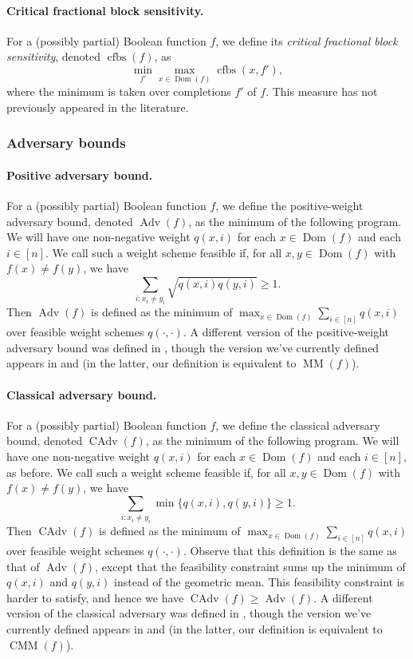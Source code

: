 \documentclass[10pt,a4paper]{article}
\theoremstyle{definition}
\DeclareMathOperator{\Dom}{Dom}
\renewcommand{\>}{\rangle}
\newcommand{\<}{\langle}
\DeclareMathOperator{\cfbs}{cfbs}
\DeclareMathOperator{\Adv}{Adv}
\DeclareMathOperator{\CAdv}{CAdv}
\begin{document}
\paragraph{Critical fractional block sensitivity.}
For a (possibly partial) Boolean function $f$, we define
its \emph{critical fractional block sensitivity}, denoted
$\cfbs(f)$, as
\[\min_{f'}\max_{x\in\Dom(f)}\cfbs(x,f'),\]
where the minimum is taken over completions $f'$ of $f$.
This measure has not previously appeared in the literature.

\subsubsection{Adversary bounds}
\label{sec:prelim_adv}

\paragraph{Positive adversary bound.}
For a (possibly partial) Boolean function $f$,
we define the positive-weight adversary bound,
denoted $\Adv(f)$, as the minimum of the following program.
We will have one non-negative weight $q(x,i)$
for each $x\in\Dom(f)$ and each $i\in[n]$. We call
such a weight scheme feasible if, for all
$x,y\in\Dom(f)$ with $f(x)\ne f(y)$,
we have
\[\sum_{i:x_i\ne y_i} \sqrt{q(x,i)q(y,i)}\ge 1.\]
Then $\Adv(f)$ is defined as the minimum
of $\max_{x\in\Dom(f)}\sum_{i\in[n]} q(x,i)$
over feasible weight schemes $q(\cdot,\cdot)$.
A different version of the positive-weight
adversary bound was defined in \cite{Amb02},
though the version we've currently defined
appears in \cite{LM08} and \cite{SS06}
(in the latter, our definition is equivalent
to $\operatorname{MM}(f)$).

\paragraph{Classical adversary bound.}
For a (possibly partial) Boolean function $f$,
we define the classical adversary bound,
denoted $\CAdv(f)$, as the minimum of the following
program. We will have one non-negative
weight $q(x,i)$ for each $x\in\Dom(f)$ and each $i\in[n]$,
as before. We call such a weight scheme feasible
if, for all $x,y\in\Dom(f)$ with $f(x)\ne f(y)$,
we have
\[\sum_{i:x_i\ne y_i}\min\{q(x,i),q(y,i)\}\ge 1.\]
Then $\CAdv(f)$ is defined as the minimum
of $\max_{x\in\Dom(f)}\sum_{i\in[n]} q(x,i)$
over feasible weight schemes $q(\cdot,\cdot)$.
Observe that this definition is the same as
that of $\Adv(f)$, except that the feasibility
constraint sums up the minimum of $q(x,i)$ and
$q(y,i)$ instead of the geometric mean. This feasibility
constraint is harder to satisfy, and hence we have
$\CAdv(f)\ge\Adv(f)$.
A different version of the classical adversary
was defined in \cite{Aar06}, though the version
we've currently defined appears in \cite{LM08}
and \cite{AKPV18} (in the latter, our definition
is equivalent to $\operatorname{CMM}(f)$).
\end{document}
